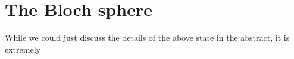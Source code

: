 \section{The Bloch sphere}

While we could just discuss the details of the above state in the abstract, it is extremely 
